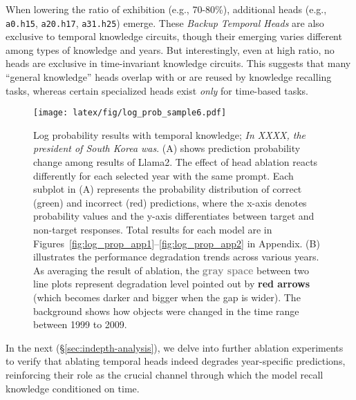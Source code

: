 When lowering the ratio of exhibition (e.g., 70-80\%), additional heads (e.g., \verb|a0.h15|, \verb|a20.h17|, \verb|a31.h25|) emerge.
These \emph{Backup Temporal Heads} are also exclusive to temporal knowledge circuits, though their emerging varies different among types of knowledge and years.
But interestingly, even at high ratio, no heads are exclusive in time-invariant knowledge circuits.
This suggests that many “general knowledge” heads overlap with or are reused by knowledge recalling tasks, whereas certain specialized heads exist \emph{only} for time-based tasks.

\begin{figure*}[t]
\vspace{-10pt}
\begin{center}
    \texttt{[image: latex/fig/log\_prob\_sample6.pdf]}
\end{center}%
\vspace{-10pt}%
\caption{Log probability results with temporal knowledge; \textit{In XXXX, the president of South Korea was}.
(A) shows prediction probability change among results of Llama2.
The effect of head ablation reacts differently for each selected year with the same prompt.
Each subplot in (A) represents the probability distribution of correct (\textcolor{green!60!blue}{green}) and incorrect (\textcolor{red!80!white}{red}) predictions, where the x-axis denotes probability values and the y-axis differentiates between target and non-target responses.
Total results for each model are in Figures~\ref{fig:log_prop_app1}--\ref{fig:log_prop_app2} in Appendix.
(B) illustrates the performance degradation trends across various years.
As averaging the result of ablation, the \textcolor{gray}{\textbf{gray space}} between two line plots represent degradation level pointed out by \textcolor{red!70!black}{\textbf{red arrows}} (which becomes darker and bigger when the gap is wider).
The background shows how objects were changed in the time range between 1999 to 2009.}
\label{fig:log_prob}
\vspace{-10pt}
\end{figure*}

In the next (\S\ref{sec:indepth-analysis}), we delve into further ablation experiments to verify that ablating temporal heads indeed degrades year-specific predictions, reinforcing their role as the crucial channel through which the model recall knowledge conditioned on time.
